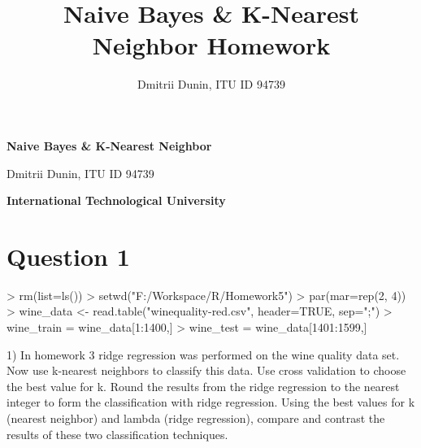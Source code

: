 \documentclass{article}
\title{Naive Bayes \& K-Nearest Neighbor Homework}
\author{Dmitrii Dunin, ITU ID 94739}
\begin{document}

\begin{center}
{\bf\Large Naive Bayes \& K-Nearest Neighbor}
\end{center}
\begin{center}
{\Large Dmitrii Dunin, ITU ID 94739}
\end{center}
\begin{center}
{\bf\Large International Technological University}
\end{center}

\section*{Question 1}

\begin{Schunk}
\begin{Sinput}
> rm(list=ls())
> setwd("F:/Workspace/R/Homework5")
> par(mar=rep(2, 4))
> wine_data <- read.table("winequality-red.csv", header=TRUE, sep=";")
> wine_train = wine_data[1:1400,]
> wine_test = wine_data[1401:1599,]
\end{Sinput}
\end{Schunk}

1) In homework 3 ridge regression was performed on the wine quality data
set. Now use k-nearest neighbors to classify this data. Use cross validation
to choose the best value for k. Round the results from the ridge regression to
the nearest integer to form the classification with ridge regression. Using the
best values for k (nearest neighbor) and lambda (ridge regression), compare
and contrast the results of these two classification techniques.
\end{document}

